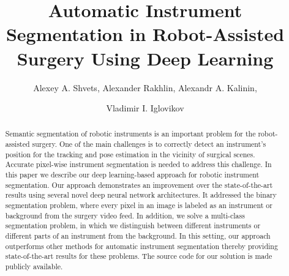 \documentclass[runningheads,a4paper]{llncs}[2015/06/24]
\begin{document}
\title{Automatic Instrument Segmentation in Robot-Assisted Surgery Using Deep Learning}
{}



\author{Alexey A. Shvets, Alexander Rakhlin, Alexandr A. Kalinin, \\ \and Vladimir I. Iglovikov}


\maketitle

\begin{abstract}
Semantic segmentation of robotic instruments is an important problem for the robot-assisted surgery. One of the main challenges is to correctly detect an instrument's position for the tracking and pose estimation in the vicinity of surgical scenes. Accurate pixel-wise instrument segmentation is needed to address this challenge. In this paper we describe our deep learning-based approach for robotic instrument segmentation. Our approach demonstrates an improvement over the state-of-the-art results using several novel deep neural network architectures. It addressed the binary segmentation problem, where every pixel in an image is labeled as an instrument or background from the surgery video feed. In addition, we solve a multi-class segmentation problem, in which we distinguish between different instruments or different parts of an instrument from the background. In this setting, our approach outperforms other methods for automatic instrument segmentation thereby providing state-of-the-art results for these problems.
The source code for our solution is made publicly available.
\end{abstract}
\end{document}
